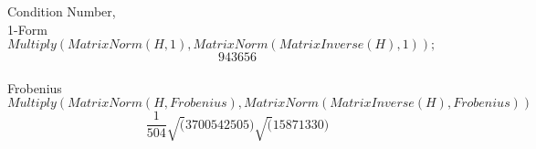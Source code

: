 \documentclass[12pt]{article}
\begin{document}
Condition Number,\\

1-Form\\
$Multiply(MatrixNorm(H, 1), MatrixNorm(MatrixInverse(H), 1));$\\
$$943656$$\\

Frobenius\\
$Multiply(MatrixNorm(H, Frobenius), MatrixNorm(MatrixInverse(H), Frobenius))$\\
$$\frac{1}{504}\sqrt(3700542505)\sqrt(15871330)$$
\end{document}
